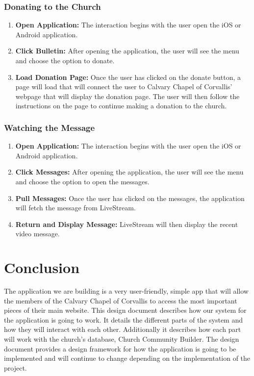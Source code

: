 \documentclass[letterpaper,10pt,draftclsnofoot,onecolumn,titlepage]{IEEEtran}
\begin{document}
			\subsubsection{Donating to the Church}
				\begin{enumerate}
					\item \textbf{Open Application:} The interaction begins with the user open the iOS or Android application.
					\item \textbf{Click Bulletin:} After opening the application, the user will see the menu and choose the option to donate.
					\item \textbf{Load Donation Page:} Once the user has clicked on the donate button, a page will load that will connect the user to Calvary Chapel of Corvallis' webpage that will display the donation page.
					The user will then follow the instructions on the page to continue making a donation to the church.
				\end{enumerate}

			\subsubsection{Watching the Message}
				\begin{enumerate}
					\item \textbf{Open Application:} The interaction begins with the user open the iOS or Android application.
					\item \textbf{Click Messages:} After opening the application, the user will see the menu and choose the option to open the messages.
					\item \textbf{Pull Messages:} Once the user has clicked on the messages, the application will fetch the message from LiveStream.
					\item \textbf{Return and Display Message:} LiveStream will then display the recent video message.
				\end{enumerate}




	\section{Conclusion}
		The application we are building is a very user-friendly, simple app that will allow the members of the Calvary Chapel of Corvallis to access the most important pieces of their main website.
		This design document describes how our system for the application is going to work.
		It details the different parts of the system and how they will interact with each other.
		Additionally it describes how each part will work with the church's database, Church Community Builder.
		The design document provides a design framework for how the application is going to be implemented and will continue to change depending on the implementation of the project.
\end{document}
